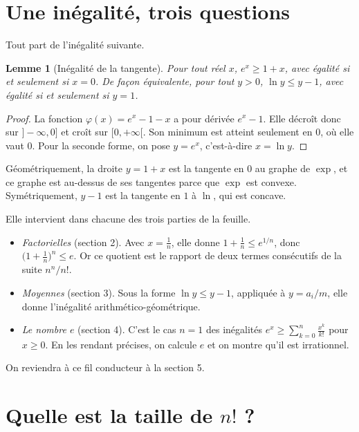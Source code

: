 \documentclass[11pt,a4paper]{article}
\theoremstyle{plain}
\newtheorem{lemme}[theoreme]{Lemme}
\theoremstyle{definition}
\theoremstyle{remark}
\begin{document}
\tableofcontents

\section{Une inégalité, trois questions}

Tout part de l'inégalité suivante.

\begin{lemme}[Inégalité de la tangente]\label{lem:tangente}
Pour tout réel $x$, $e^x\geq1+x$, avec égalité si et seulement si $x=0$. De façon équivalente, pour tout $y>0$, $\ln y\leq y-1$, avec égalité si et seulement si $y=1$.
\end{lemme}

\begin{proof}
La fonction $\varphi(x)=e^x-1-x$ a pour dérivée $e^x-1$. Elle décroît donc sur $]-\infty,0]$ et croît sur $[0,+\infty[$. Son minimum est atteint seulement en $0$, où elle vaut $0$. Pour la seconde forme, on pose $y=e^x$, c'est-à-dire $x=\ln y$.
\end{proof}

Géométriquement, la droite $y=1+x$ est la tangente en $0$ au graphe de $\exp$, et ce graphe est au-dessus de ses tangentes parce que $\exp$ est convexe. Symétriquement, $y-1$ est la tangente en $1$ à $\ln$, qui est concave.

Elle intervient dans chacune des trois parties de la feuille.
\begin{itemize}[nosep]
\item \emph{Factorielles} (section 2). Avec $x=\frac1n$, elle donne $1+\frac1n\leq e^{1/n}$, donc $\big(1+\frac1n\big)^n\leq e$. Or ce quotient est le rapport de deux termes consécutifs de la suite $n^n/n!$.
\item \emph{Moyennes} (section 3). Sous la forme $\ln y\leq y-1$, appliquée à $y=a_i/m$, elle donne l'inégalité arithmético-géométrique.
\item \emph{Le nombre $e$} (section 4). C'est le cas $n=1$ des inégalités $e^x\geq\sum_{k=0}^n\frac{x^k}{k!}$ pour $x\geq0$. En les rendant précises, on calcule $e$ et on montre qu'il est irrationnel.
\end{itemize}
On reviendra à ce fil conducteur à la section 5.

\section{Quelle est la taille de \texorpdfstring{$n!$}{n!} ?}
\end{document}
